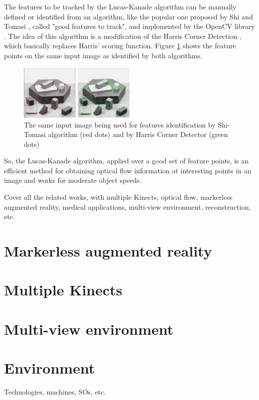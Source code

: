 \documentclass[msc, a4paper, classic, en]{ufbathesis}
\begin{document}
The features to be tracked by the Lucas-Kanade algorithm can be manually defined or identified from an algorithm, like the popular one proposed by Shi and Tomasi \cite{shi}, called "good features to track", and implemented by the OpenCV library \cite{opencv}. The idea of this algorithm is a modification of the Harris Corner Detection \cite{harris}, which basically replaces Harris' scoring function. Figure \ref{fig:shi-harris} shows the feature points on the same input image as identified by both algorithms.

\begin{figure}
\label{fig:shi-harris}
\centering
\includegraphics[width=0.5\textwidth]{images/shi-harris.png}
\caption{The same input image being used for features identification by Shi-Tomasi algorithm (red dots) and by Harris Corner Detector (green dots)}
\end{figure}

So, the Lucas-Kanade algorithm, applied over a good set of feature points, is an efficient method for obtaining optical flow information at interesting points in an image and works for moderate object speeds.

Cover all the related works, with multiple Kinects, optical flow, markerless augmented reality, medical applications, multi-view environment, reconstruction, etc.
\section{Markerless augmented reality}
\section{Multiple Kinects}
\section{Multi-view environment}

\section{Environment}
Technologies, machines, SOs, etc.
\end{document}

